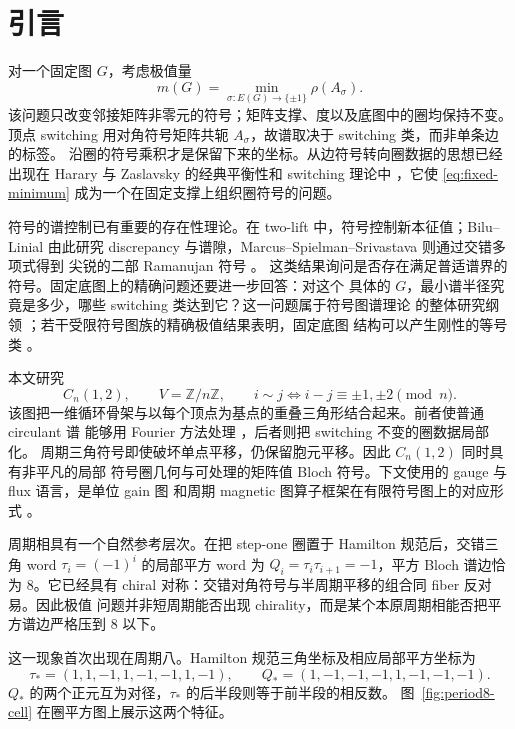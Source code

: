\section{引言}
\label{sec:introduction}

对一个固定图 $G$，考虑极值量
\begin{equation}
 m(G)=\min_{\sigma:E(G)\to\{\pm1\}}\rho(A_\sigma).
 \label{eq:fixed-minimum}
\end{equation}
该问题只改变邻接矩阵非零元的符号；矩阵支撑、度以及底图中的圈均保持不变。顶点
switching 用对角符号矩阵共轭 $A_\sigma$，故谱取决于 switching 类，而非单条边的标签。
沿圈的符号乘积才是保留下来的坐标。从边符号转向圈数据的思想已经出现在 Harary 与
Zaslavsky 的经典平衡性和 switching 理论中 \cite{Harary1953,Zaslavsky1982}，它使
\eqref{eq:fixed-minimum} 成为一个在固定支撑上组织圈符号的问题。

符号的谱控制已有重要的存在性理论。在 two-lift 中，符号控制新本征值；Bilu--Linial
由此研究 discrepancy 与谱隙，Marcus--Spielman--Srivastava 则通过交错多项式得到
尖锐的二部 Ramanujan 符号 \cite{BiluLinial2006,MarcusSpielmanSrivastava2015}。
这类结果询问是否存在满足普适谱界的符号。固定底图上的精确问题还要进一步回答：对这个
具体的 $G$，最小谱半径究竟是多少，哪些 switching 类达到它？这一问题属于符号图谱理论
的整体研究纲领 \cite{BelardoEtAl2018}；若干受限符号图族的精确极值结果表明，固定底图
结构可以产生刚性的等号类 \cite{BrunettiStanic2022,GhorbaniMajidi2024}。

本文研究
\[
 C_n(1,2),\qquad V=\mathbb Z/n\mathbb Z,\qquad
 i\sim j\iff i-j\equiv\pm1,\pm2\pmod n.
\]
该图把一维循环骨架与以每个顶点为基点的重叠三角形结合起来。前者使普通 circulant 谱
能够用 Fourier 方法处理 \cite{Davis1979}，后者则把 switching 不变的圈数据局部化。
周期三角符号即使破坏单点平移，仍保留胞元平移。因此 $C_n(1,2)$ 同时具有非平凡的局部
符号圈几何与可处理的矩阵值 Bloch 符号。下文使用的 gauge 与 flux 语言，是单位 gain 图
和周期 magnetic 图算子框架在有限符号图上的对应形式
\cite{Reff2012,KorotyaevSaburova2017,KorotyaevSaburova2023}。

周期相具有一个自然参考层次。在把 step-one 圈置于 Hamilton 规范后，交错三角 word
$\tau_i=(-1)^i$ 的局部平方 word 为 $Q_i=\tau_i\tau_{i+1}=-1$，平方 Bloch 谱边恰为
$8$。它已经具有 chiral 对称：交错对角符号与半周期平移的组合同 fiber 反对易。因此极值
问题并非短周期能否出现 chirality，而是某个本原周期相能否把平方谱边严格压到 $8$ 以下。

这一现象首次出现在周期八。Hamilton 规范三角坐标及相应局部平方坐标为
\begin{equation}
 \tau_*=(1,1,-1,1,-1,-1,1,-1),\qquad
 Q_*=(1,-1,-1,-1,1,-1,-1,-1).
 \label{eq:target-words}
\end{equation}
$Q_*$ 的两个正元互为对径，$\tau_*$ 的后半段则等于前半段的相反数。
图~\ref{fig:period8-cell} 在圈平方图上展示这两个特征。

